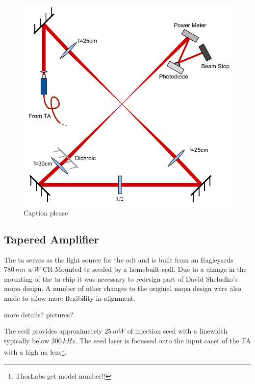 \begin{figure}
\centering
\includegraphics{figs/DipoleTrapRig.pdf}
\caption{{\color{red} Caption please}}
\end{figure}

\subsection{Tapered Amplifier}
The \gls{ta} serves as the light source for the \gls{odt} and is built from an Eagleyards $780\,\unit{nm}$ $w\,\unit{W}$ CR-Mounted \gls{ta} seeded by a homebuilt \gls{ecdl}. Due to a change in the mounting of the \gls{ta} chip it was necessary to redesign part of David Sheludko's \gls{mopa} design. A number of other changes to the original \gls{mopa} design were also made to allow more flexibility in alignment.

{\color{red} more details? pictures?}

The \gls{ecdl} provides approximately $25\,\unit{mW}$ of injection seed with a linewidth typically below $300\,\unit{kHz}$. The seed laser is focussed onto the input cacet of the TA with a high \gls{na} lens\footnote{ThorLabs {\color{red} get model number!!}}.

